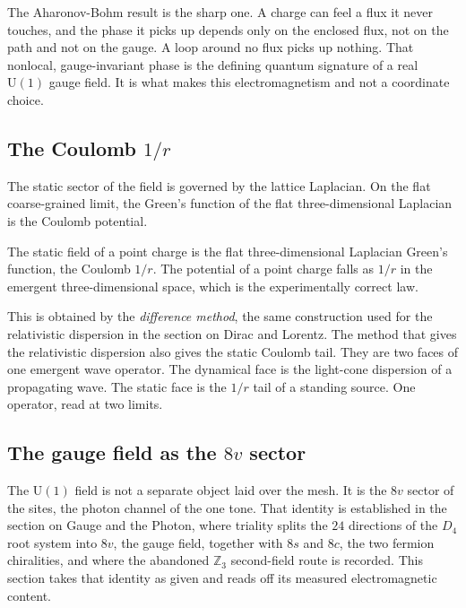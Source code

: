 The Aharonov-Bohm result is the sharp one. A charge can feel a flux it never touches, and the phase it picks up depends only on the enclosed flux, not on the path and not on the gauge. A loop around no flux picks up nothing. That nonlocal, gauge-invariant phase is the defining quantum signature of a real $\mathrm{U}(1)$ gauge field. It is what makes this electromagnetism and not a coordinate choice.

\subsection{The Coulomb $1/r$}

The static sector of the field is governed by the lattice Laplacian. On the flat coarse-grained limit, the Green's function of the flat three-dimensional Laplacian is the Coulomb potential.

\begin{result}
The static field of a point charge is the flat three-dimensional Laplacian Green's function, the Coulomb $1/r$. The potential of a point charge falls as $1/r$ in the emergent three-dimensional space, which is the experimentally correct law.
\end{result}

This is obtained by the \emph{difference method}, the same construction used for the relativistic dispersion in the section on Dirac and Lorentz. The method that gives the relativistic dispersion also gives the static Coulomb tail. They are two faces of one emergent wave operator. The dynamical face is the light-cone dispersion of a propagating wave. The static face is the $1/r$ tail of a standing source. One operator, read at two limits.

\subsection{The gauge field as the $8v$ sector}

The $\mathrm{U}(1)$ field is not a separate object laid over the mesh. It is the $8v$ sector of the sites, the photon channel of the one tone. That identity is established in the section on Gauge and the Photon, where triality splits the $24$ directions of the $D_4$ root system into $8v$, the gauge field, together with $8s$ and $8c$, the two fermion chiralities, and where the abandoned $\mathbb{Z}_3$ second-field route is recorded. This section takes that identity as given and reads off its measured electromagnetic content.


